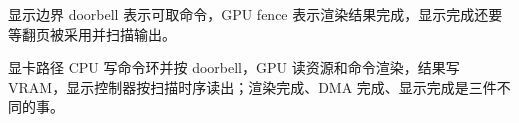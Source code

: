 \begin{chapteranswer}{显示边界}
doorbell 表示可取命令，GPU fence 表示渲染结果完成，显示完成还要等翻页被采用并扫描输出。
\end{chapteranswer}

\begin{chapteranswer}{显卡路径}
CPU 写命令环并按 doorbell，GPU 读资源和命令渲染，结果写 VRAM，显示控制器按扫描时序读出；渲染完成、DMA 完成、显示完成是三件不同的事。
\end{chapteranswer}
